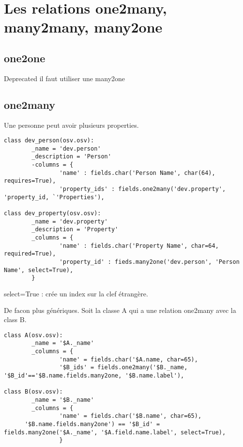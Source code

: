 \documentclass[12pt,a4paper]{article}
\begin{document}
\section{Les relations one2many, many2many, many2one}
\label{sec:relations}

\subsection{one2one}
\label{sec:one2one}

Deprecated il faut utiliser une many2one

\subsection{one2many}
\label{sec:one2m}

Une personne peut avoir plusieurs properties.

\begin{verbatim}
class dev_person(osv.osv):
        _name = 'dev.person'
        _description = 'Person'
        -columns = {
                'name' : fields.char('Person Name', char(64), requires=True),
                'property_ids' : fields.one2many('dev.property', 'property_id, `'Properties'),

class dev_property(osv.osv):
        _name = 'dev.property'
        _description = 'Property'
        _columns = {
                'name' : fields.char('Property Name', char=64, required=True),
                'property_id' : fieds.many2one('dev.person', 'Person Name', select=True),
        }
\end{verbatim}

select=True : crée un index sur la clef étrangère.

De facon plus génériques. Soit la classe A qui a une relation one2many avec la class B.


\begin{verbatim}
class A(osv.osv):
        _name = '$A._name'
        _columns = {
                'name' = fields.char('$A.name, char=65),
                '$B_ids' = fields.one2many('$B._name, '$B_id'=='$B.name.fields.many2one, '$B.name.label'),

class B(osv.osv):
        _name = '$B._name'
        _columns = {
                'name' = fields.char('$B.name', char=65),
      '$B.name.fields.many2one') == '$B_id' = fields.many2one('$A._name', '$A.field.name.label', select=True),
                }
\end{verbatim}
\end{document}

